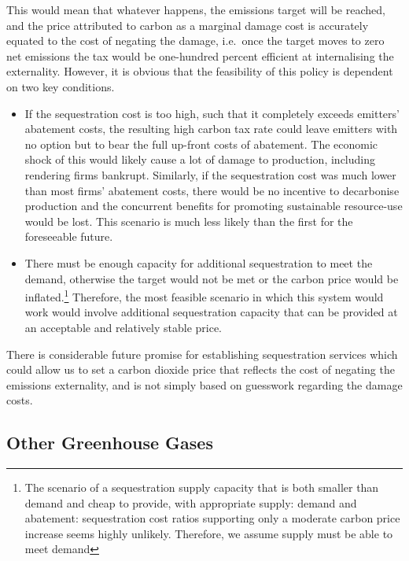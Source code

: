 \documentclass[]{tufte-handout}
\begin{document}
This would mean that whatever happens, the emissions target will be
reached, and the price attributed to carbon as a marginal damage cost is
accurately equated to the cost of negating the damage, i.e.~once the
target moves to zero net emissions the tax would be one-hundred percent
efficient at internalising the externality. However, it is obvious that
the feasibility of this policy is dependent on two key conditions.

\begin{itemize}
\item
  If the sequestration cost is too high, such that it completely exceeds
  emitters' abatement costs, the resulting high carbon tax rate could
  leave emitters with no option but to bear the full up-front costs of
  abatement. The economic shock of this would likely cause a lot of
  damage to production, including rendering firms bankrupt. Similarly,
  if the sequestration cost was much lower than most firms' abatement
  costs, there would be no incentive to decarbonise production and the
  concurrent benefits for promoting sustainable resource-use would be
  lost. This scenario is much less likely than the first for the
  foreseeable future.
\item
  There must be enough capacity for additional sequestration to meet the
  demand, otherwise the target would not be met or the carbon price
  would be inflated.\footnote{The scenario of a sequestration supply
    capacity that is both smaller than demand and cheap to provide, with
    appropriate supply: demand and abatement: sequestration cost ratios
    supporting only a moderate carbon price increase seems highly
    unlikely. Therefore, we assume supply must be able to meet demand}
  Therefore, the most feasible scenario in which this system would work
  would involve additional sequestration capacity that can be provided
  at an acceptable and relatively stable price.
\end{itemize}

There is considerable future promise for establishing sequestration
services which could allow us to set a carbon dioxide price that
reflects the cost of negating the emissions externality, and is not
simply based on guesswork regarding the damage costs.

\hypertarget{other-greenhouse-gases}{%
\subsection{Other Greenhouse Gases}\label{other-greenhouse-gases}}
\end{document}
